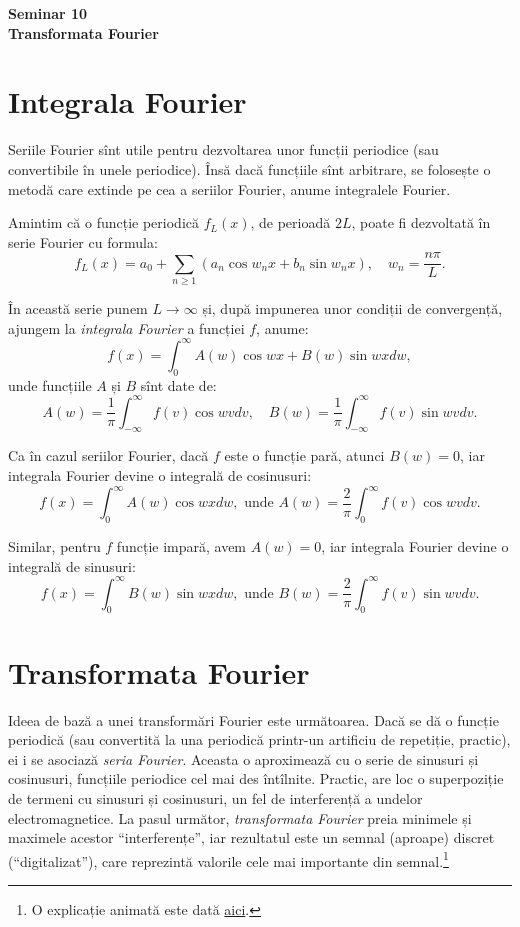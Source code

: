 \documentclass[12pt,a4paper]{article}
\newcommand\qq{\enquote}
\theoremstyle{dotless}
\theoremstyle{dotlessdr}
\begin{document}

\begin{center}
  {\large\textbf{Seminar 10 \\
      Transformata Fourier}}
\end{center}

\vspace{2cm}

\section*{Integrala Fourier}
\indent\indent
Seriile Fourier sînt utile pentru dezvoltarea unor funcții periodice (sau convertibile
în unele periodice). Însă dacă funcțiile sînt arbitrare, se folosește o metodă care
extinde pe cea a seriilor Fourier, anume integralele Fourier.

Amintim că o funcție periodică $ f_L(x) $, de perioadă $ 2L $, poate fi dezvoltată în
serie Fourier cu formula:
\[
  f_L(x) = a_0 + \sum_{n \geq 1} (a_n \cos w_n x + b_n \sin w_n x), \quad %
  w_n = \frac{n\pi}{L}.
\]

În această serie punem $ L \to \infty $ și, după impunerea unor condiții
de convergență, ajungem la \emph{integrala Fourier} a funcției $ f $, anume:
\[
  f(x) = \int_0^\infty A(w) \cos wx + B(w) \sin wx dw,
\]
unde funcțiile $ A $ și $ B $ sînt date de:
\[
  A(w) = \frac{1}{\pi} \int_{-\infty}^\infty f(v) \cos wv dv, \quad %
  B(w) = \frac{1}{\pi} \int_{-\infty}^\infty f(v) \sin wv dv.
\]

Ca în cazul seriilor Fourier, dacă $ f $ este o funcție pară, atunci $ B(w) = 0 $,
iar integrala Fourier devine o integrală de cosinusuri:
\[
  f(x) = \int_0^\infty A(w) \cos wx dw, \text{ unde } %
  A(w) = \frac{2}{\pi} \int_0^\infty f(v) \cos wv dv.
\]

Similar, pentru $ f $ funcție impară, avem $ A(w) = 0 $, iar integrala Fourier devine
o integrală de sinusuri:
\[
  f(x) = \int_0^\infty B(w) \sin wx dw, \text{ unde } %
  B(w) = \frac{2}{\pi} \int_0^\infty f(v) \sin wv dv.
\]


\section*{Transformata Fourier}

\indent\indent
Ideea de bază a unei transformări Fourier este următoarea. Dacă se dă o funcție periodică
(sau convertită la una periodică printr-un artificiu de repetiție, practic), ei i se
asociază \emph{seria Fourier}. Aceasta o aproximează cu o serie de sinusuri și cosinusuri,
funcțiile periodice cel mai des întîlnite. Practic, are loc o superpoziție de termeni cu
sinusuri și cosinusuri, un fel de interferență a undelor electromagnetice. La pasul
următor, \emph{transformata Fourier} preia minimele și maximele acestor \qq{interferențe},
iar rezultatul este un semnal (aproape) discret (\qq{digitalizat}), care reprezintă
valorile cele mai importante din semnal.\footnote{O explicație animată este dată \href{https://en.wikipedia.org/wiki/Fourier_transform\#/media/File:Fourier_transform_time_and_frequency_domains_(small).gif}{aici}.}
\end{document}
